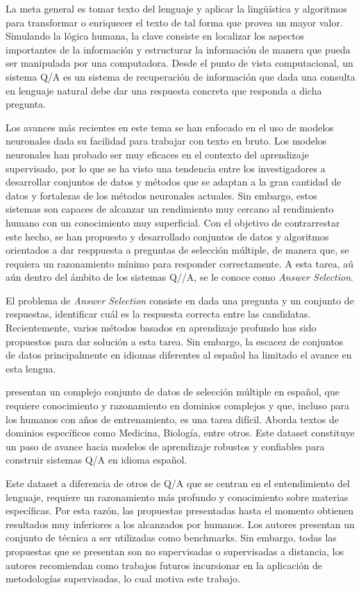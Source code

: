 La meta general es tomar texto del lenguaje y aplicar la lingüística y algoritmos para transformar o enriquecer el texto de tal forma que provea un mayor valor. Simulando la lógica humana, la clave consiste en localizar los aspectos importantes de la información y estructurar la información de manera que pueda ser manipulada por una computadora. Desde el punto de vista computacional, un sistema Q/A es un sistema de recuperación de información que dada una consulta en lenguaje natural debe dar una respuesta concreta que responda a dicha pregunta. 

Los avances más recientes en este tema se han enfocado en el uso de modelos neuronales dada su facilidad para trabajar con texto en bruto. Los modelos neuronales han probado ser muy eficaces en el contexto del aprendizaje supervisado, por lo que se ha visto una tendencia entre los investigadores a desarrollar conjuntos de datos y métodos que se adaptan a la gran cantidad de datos y fortalezas de los métodos neuronales actuales. Sin embargo, estos sistemas son capaces de alcanzar un rendimiento muy cercano al rendimiento humano con un conocimiento muy superficial. Con el objetivo de contrarrestar este hecho, se han propuesto y desarrollado conjuntos de datos y algoritmos orientados a dar resppuesta a preguntas de selección múltiple, de manera que, se requiera un razonamiento mínimo para responder correctamente. A esta tarea, aú aún dentro del ámbito de los sistemas Q//A, se le conoce como \textit{Answer Selection}. 

El problema de \textit{Answer Selection} consiste en dada una pregunta y un conjunto de respuestas, identificar cuál es la respuesta correcta entre las candidatas. Recientemente, varios métodos basados en aprendizaje profundo has sido propuestos para dar solución a esta tarea. Sin embargo, la escacez de conjuntos de datos principalmente en idiomas diferentes al español ha limitado el avance en esta lengua. 

\cite{2019-head-qa} presentan un complejo conjunto de datos de selección múltiple en español, que requiere conocimiento y razonamiento en dominios complejos y que, incluso para los humanos con años de entrenamiento, es una tarea difícil. Aborda textos de dominios específicos como Medicina, Biología, entre otros. Este dataset constituye un paso de avance hacia modelos de aprendizaje robustos y confiables para construir sistemas Q/A en idioma español. 

Este dataset a diferencia de otros de Q/A que se centran en el entendimiento del lenguaje, requiere un razonamiento más profundo y conocimiento sobre materias específicas. Por esta razón, las propuestas presentadas hasta el momento obtienen resultados muy inferiores a los alcanzados por humanos. Los autores presentan un conjunto de técnica a ser utilizadas como benchmarks. Sin embargo, todas las propuestas que se presentan son no supervisadas o supervisadas a distancia, los autores recomiendan como trabajos futuros incursionar en la aplicación de metodologías supervisadas, lo cual motiva este trabajo.

